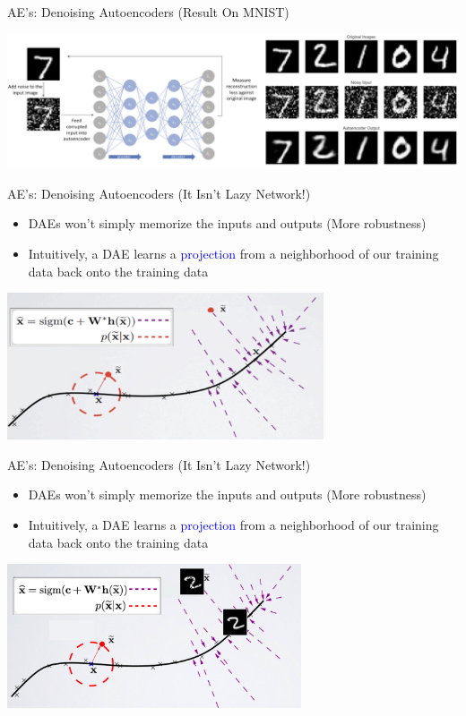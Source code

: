 \documentclass[serif, aspectratio=169]{beamer}
\begin{document}
\begin{frame}{AE’s: Denoising Autoencoders (Result On MNIST)}
      \begin{center}
        \includegraphics[width=\textwidth]{pic/DAE result on MNIST.png} 
    \end{center}
\end{frame}

\begin{frame}{AE’s: Denoising Autoencoders (It Isn’t Lazy Network!)}
    \begin{itemize}
        \item DAEs won’t simply memorize the inputs and outputs (More robustness)
        \item Intuitively, a DAE learns a \textcolor{blue}{projection} from a neighborhood of our training data back onto the training data 
    \end{itemize}

    \begin{center}
        \includegraphics[width=0.7\textwidth]{pic/DAE not lazy1.png}
    \end{center}
\end{frame}

\begin{frame}{AE’s: Denoising Autoencoders (It Isn’t Lazy Network!)}
    \begin{itemize}
        \item DAEs won’t simply memorize the inputs and outputs (More robustness)
        \item Intuitively, a DAE learns a \textcolor{blue}{projection} from a neighborhood of our training data back onto the training data 
    \end{itemize}

    \begin{center}
        \includegraphics[width=0.65\textwidth]{pic/DAE not lazy2.png}
    \end{center}
\end{frame}
\end{document}
